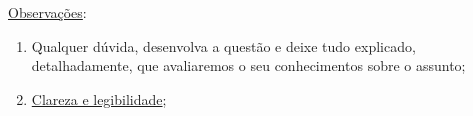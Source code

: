 \documentclass[a4paper,11pt]{article}
\begin{document}
\begin{comment}
\underline{{\large Regras Inferencias Válidas (Teoremas)}}:
{\footnotesize
\begin{description}
\setlength{\itemsep}{-2pt}
\item[Adição (AD):] $P \vdash P \vee Q$ ou $P \vdash Q \vee P$
\item[Simplificação (SIMP):] $P \wedge Q \vdash P$ ou $P \wedge Q \vdash Q$
\item[Conjunção (CONJ)] $P, Q \vdash P \wedge Q$ ou $P, Q \vdash Q \wedge P$
\item[Absorção (ABS):] $P \rightarrow Q \vdash P \rightarrow (P \wedge Q)$
\item[Modus Ponens (MP):] $P \rightarrow Q, P \vdash Q$
\item[Modus Tollens (MT):] $P \rightarrow Q, \sim Q \vdash \sim P$
\item[Silogismo Disjuntivo (SD):] $P \vee Q, \sim P \vdash Q$ ou $P \vee Q, \sim Q \vdash P$
\item[Silogismo Hipotético (SH):] $P \rightarrow Q, Q\rightarrow R \vdash P\rightarrow R$
\item[Dilema Construtivo (DC):] $P\rightarrow Q, R\rightarrow S, P \vee R \vdash Q\vee S$
\item[Dilema Destrutivo (DD):] $P\rightarrow Q, R\rightarrow S, \sim Q\vee\sim S \vdash \sim P \vee\sim R$
\end{description}
\end{comment}

\begin{flushleft}
\underline{Observações}:
\begin{enumerate}
\setlength{\itemsep}{-2pt}
\item Qualquer dúvida, desenvolva a questão e deixe tudo
explicado, detalhadamente, que avaliaremos o seu conhecimentos sobre
 o assunto;
 \item \underline{Clareza e legibilidade};
\end{enumerate}
\end{flushleft}
\end{document}
